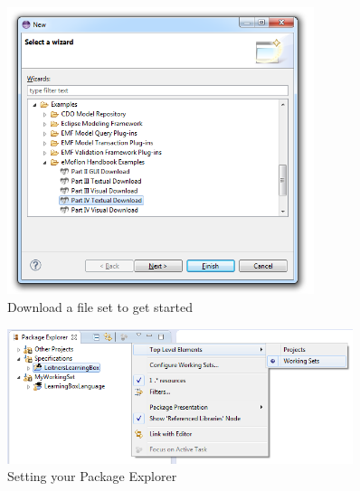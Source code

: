 \newpage

\vspace*{1cm}

\begin{figure}[htbp]
\begin{center}
  \includegraphics[width=0.8\textwidth]{eclipse_downloadWizardPartIV}
  \caption{Download a file set to get started}
  \label{fig:downPartIV}
\end{center}
\end{figure}

\vspace{0.5cm}

\begin{figure}[h!]
	\centering
  \includegraphics[width=0.9\textwidth]{eclipse_workingSets}
	\caption{Setting your Package Explorer}
	\label{fig:workingSets}
\end{figure}





